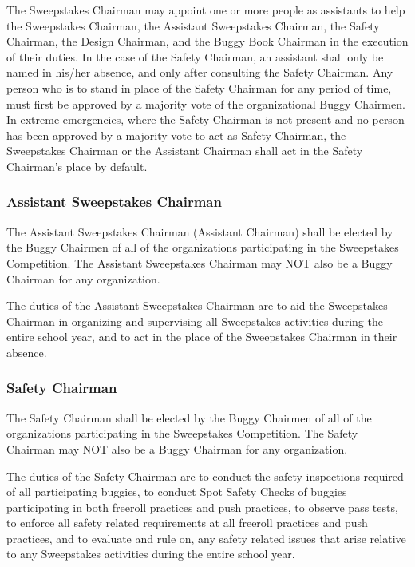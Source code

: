 	The Sweepstakes Chairman may appoint one or more people as assistants to help the Sweepstakes Chairman, the Assistant Sweepstakes Chairman, the Safety Chairman, the Design Chairman, and the Buggy Book Chairman in the execution of their duties. In the case of the Safety Chairman, an assistant shall only be named in his/her absence, and only after consulting the Safety Chairman. Any person who is to stand in place of the Safety Chairman for any period of time, must first be approved by a majority vote of the organizational Buggy Chairmen. In extreme emergencies, where the Safety Chairman is not present and no person has been approved by a majority vote to act as Safety Chairman, the Sweepstakes Chairman or the Assistant Chairman shall act in the Safety Chairman's place by default.

\subsubsection{Assistant Sweepstakes Chairman}

	The Assistant Sweepstakes Chairman (Assistant Chairman) shall be elected by the Buggy Chairmen of all of the organizations participating in the Sweepstakes Competition. The Assistant Sweepstakes Chairman may NOT also be a Buggy Chairman for any organization.

	The duties of the Assistant Sweepstakes Chairman are to aid the Sweepstakes Chairman in organizing and supervising all Sweepstakes activities during the entire school year, and to act in the place of the Sweepstakes Chairman in their absence.

\subsubsection{Safety Chairman}

	The Safety Chairman shall be elected by the Buggy Chairmen of all of the organizations participating in the Sweepstakes Competition. The Safety Chairman may NOT also be a Buggy Chairman for any organization.

	The duties of the Safety Chairman are to conduct the safety inspections required of all participating buggies, to conduct Spot Safety Checks of buggies participating in both freeroll practices and push practices, to observe pass tests, to enforce all safety related requirements at all freeroll practices and push practices, and to evaluate and rule on, any safety related issues that arise relative to any Sweepstakes activities during the entire school year.


